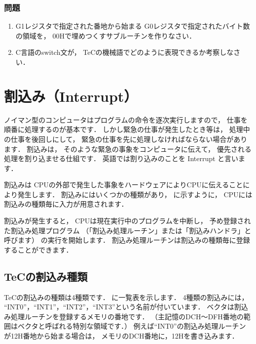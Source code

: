\vfill
\subsubsection{問題}
\begin{enumerate}
\item G1レジスタで指定された番地から始まる
G0レジスタで指定されたバイト数の領域を，
00Hで埋めつくすサブルーチンを作りなさい．
\item C言語のswitch文が，
TeCの機械語でどのように表現できるか考察しなさい．
\end{enumerate}
\vfill

\newpage
\section{割込み（Interrupt）}

ノイマン型のコンピュータはプログラムの命令を逐次実行しますので，
仕事を順番に処理するのが基本です．
しかし緊急の仕事が発生したとき等は，
処理中の仕事を後回しにして，
緊急の仕事を先に処理しなければならない場合があります．
割込みは，
そのような緊急の事象をコンピュータに伝えて，
優先される処理を割り込ませる仕組です．
英語では割り込みのことを Interrupt と言います．

割込みは
CPUの外部で発生した事象をハードウェアによりCPUに伝えることにより発生します．
割込みにはいくつかの種類があり，
に示すように，
CPUには割込みの種類毎に入力が用意されます．

割込みが発生すると，
CPUは現在実行中のプログラムを中断し，
予め登録された割込み処理プログラム
（「割込み処理ルーチン」または「割込みハンドラ」と呼びます）
の実行を開始します．
割込み処理ルーチンは割込みの種類毎に登録することができます．


\subsection{TeCの割込み種類}

TeCの割込みの種類は4種類です．
に一覧表を示します．
4種類の割込みには，
``INT0''，``INT1''，``INT2''，``INT3''という名前が付いています．
ベクタは割込み処理ルーチンを登録するメモリの番地です．
（主記憶のDCH〜DFH番地の範囲はベクタと呼ばれる特別な領域です．）
例えば``INT0''の割込み処理ルーチンが12H番地から始まる場合は，
メモリのDCH番地に，12Hを書き込みます．


